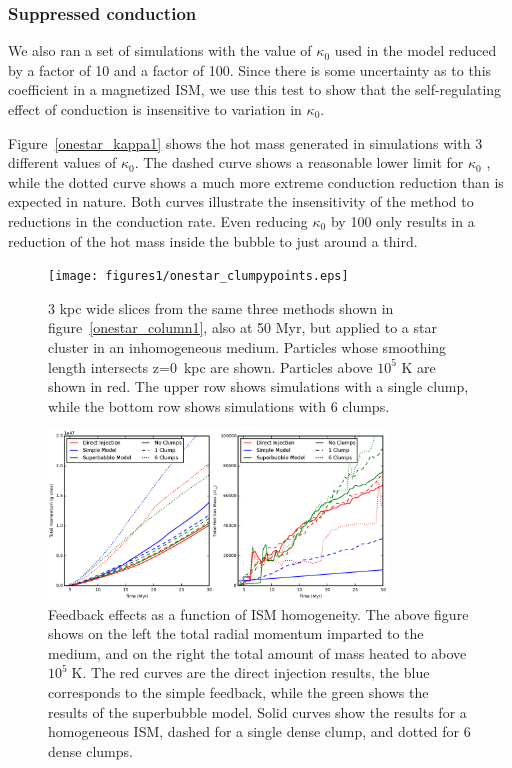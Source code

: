 \subsubsection{Suppressed conduction}

We also ran a set of simulations with the value of $\kappa_0$ used in the model
reduced by a factor of 10 and a factor of 100.  Since there is some uncertainty
as to this coefficient in a magnetized ISM, we use this test to show that the
self-regulating effect of conduction is insensitive to variation in $\kappa_0$.

Figure~\ref{onestar_kappa1} shows the hot mass generated in simulations with 3
different values of $\kappa_0$.  The dashed curve shows a reasonable lower limit
for $\kappa_0$ \citep{Cowie1977}, while the dotted curve shows a much more
extreme conduction reduction than is expected in nature.  Both curves illustrate
the insensitivity of the method to reductions in the conduction rate.  Even
reducing $\kappa_0$ by 100 only results in a reduction of the hot mass inside
the bubble to just around a third.  


\begin{figure}
    \texttt{[image: figures1/onestar\_clumpypoints.eps]}
    \caption[Image of superbubbles in a clumpy ISM]{3 kpc wide slices
    from the same three methods shown in figure~\ref{onestar_column1}, also at 50
    Myr, but applied to a star cluster in an inhomogeneous medium.  Particles
    whose smoothing length intersects z=0~kpc are shown.  Particles above $10^5$
    K are shown in red.  The upper row shows simulations with a single clump,
    while the bottom row shows simulations with 6 clumps.}
    \label{onestar_clumpyslice1}
\end{figure}

\begin{figure}
    \includegraphics[width=0.8\textwidth]{figures1/onestar_clumpy.eps}
    \caption[Feedback effects as a function of ISM homogeneity]{Feedback effects
    as a function of ISM homogeneity.  The above figure shows on the left the
    total radial momentum imparted to the medium, and on the right the total
    amount of mass heated to above $10^5\;\mathrm{K}$.  The red curves are the
    direct injection results, the blue corresponds to the simple feedback, while
    the green shows the results of the superbubble model.  Solid curves show the
    results for a homogeneous ISM, dashed for a single dense clump, and dotted
    for 6 dense clumps.}
    \label{onestar_clumpy1}
\end{figure}

